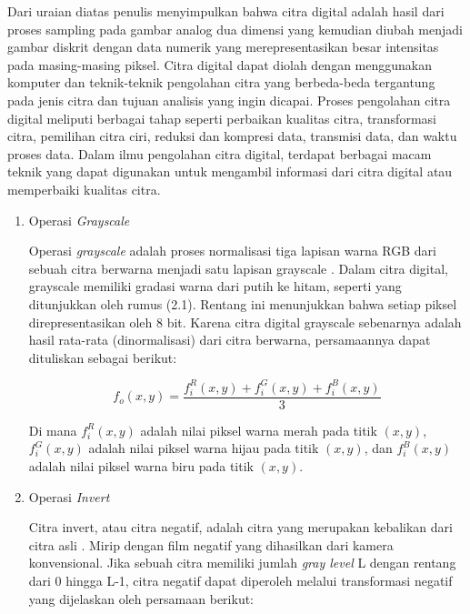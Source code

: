 Dari uraian diatas penulis menyimpulkan bahwa citra digital adalah hasil dari proses sampling pada gambar analog dua dimensi yang kemudian diubah menjadi gambar diskrit dengan data numerik yang merepresentasikan besar intensitas pada masing-masing piksel. Citra digital dapat diolah dengan menggunakan komputer dan teknik-teknik pengolahan citra yang berbeda-beda tergantung pada jenis citra dan tujuan analisis yang ingin dicapai. Proses pengolahan citra digital meliputi berbagai tahap seperti perbaikan kualitas citra, transformasi citra, pemilihan citra ciri, reduksi dan kompresi data, transmisi data, dan waktu proses data. Dalam ilmu pengolahan citra digital, terdapat berbagai macam teknik yang dapat digunakan untuk mengambil informasi dari citra digital atau memperbaiki kualitas citra.

\begin{enumerate}[leftmargin=1cm, itemindent=0.6cm,labelwidth=15pt, labelsep=5pt, listparindent=1cm,align=left]

\item Operasi \textit{Grayscale}

    Operasi \textit{grayscale} adalah proses normalisasi tiga lapisan warna RGB dari sebuah citra berwarna menjadi satu lapisan grayscale \cite{suryowinoto2017penggunaan}. Dalam citra digital, grayscale memiliki gradasi warna dari putih ke hitam, seperti yang ditunjukkan oleh rumus (2.1). Rentang ini menunjukkan bahwa setiap piksel direpresentasikan oleh 8 bit. Karena citra digital grayscale sebenarnya adalah hasil rata-rata (dinormalisasi) dari citra berwarna, persamaannya dapat dituliskan sebagai berikut:

\begin{equation}
f_o(x,y) = \frac{f_i^R(x,y) + f_i^G(x,y) + f_i^B(x,y)}{3}
\end{equation}

Di mana \(f_i^R(x,y)\) adalah nilai piksel warna merah pada titik \((x,y)\), \(f_i^G(x,y) \) adalah nilai piksel warna hijau pada titik \((x,y)\), dan \(f_i^B(x,y)\) adalah nilai piksel warna biru pada titik \((x,y)\).

\item Operasi \textit{Invert}

    Citra invert, atau citra negatif, adalah citra yang merupakan kebalikan dari citra asli \cite{mahardika2017implementasi}. Mirip dengan film negatif yang dihasilkan dari kamera konvensional. Jika sebuah citra memiliki jumlah \textit{gray level} L dengan rentang dari 0 hingga L-1, citra negatif dapat diperoleh melalui transformasi negatif yang dijelaskan oleh persamaan berikut:


\end{enumerate}
